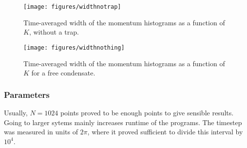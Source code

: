 \begin{figure}[H]
\begin{center}
\texttt{[image: figures/widthnotrap]}
\caption{Time-averaged width of the momentum histograms as a function of $K$, without a trap.}
\label{fig:widthnotrap}
\end{center}
\end{figure}

\begin{figure}[H]
\begin{center}
\texttt{[image: figures/widthnothing]}
\caption{Time-averaged width of the momentum histograms as a function of $K$ for a free condensate.}
\label{fig:widthnothing}
\end{center}
\end{figure}

\subsubsection{Parameters}
Usually, $N=1024$ points proved to be enough points to give sensible results. Going to larger sytems mainly increases runtime of the programs. The timestep was measured in units of $2\pi$, where it proved sufficient to divide this interval by $10^{4}$. 

